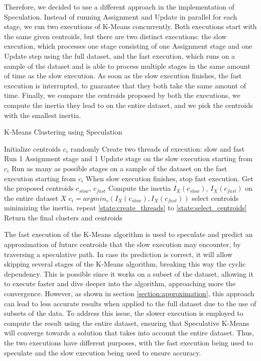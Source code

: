Therefore, we decided to use a different approach in the implementation of Speculation. Instead of running Assignment and Update in parallel for each stage, we run two executions of K-Means concurrently. Both executions start with the same given centroids, but there are two distinct executions: the slow execution, which processes one stage consisting of one Assignment stage and one Update step using the full dataset, and the fast execution, which runs on a sample of the dataset and is able to process multiple stages in the same amount of time as the slow execution. As soon as the slow execution finishes, the fast execution is interrupted, to guarantee that they both take the same amount of time.
Finally, we compare the centroids proposed by both the executions, we compute the inertia they lead to on the entire dataset, and we pick the centroids with the smallest inertia.
\begin{algorithm}
\caption{K-Means Clustering using Speculation}
\label{alg:kmeans_speculation}
\begin{algorithmic}[1]
\State Initialize centroids $c_i$ randomly
\State Create two threads of execution: slow and fast
\label{state:create_threads}
\State Run 1 Assignment stage and 1 Update stage on the slow execution starting from $c_i$
\State Run as many as possible stages on a sample of the dataset on the fast execution starting from $c_i$
\State When slow execution finishes, stop fast execution. Get the proposed centroids $c_{slow}$, $c_{fast}$
\State Compute the inertia $I_X(c_{slow})$, $I_X(c_{fast})$ on the entire dataset $X$
\State $c_i = argmin_c(I_X(c_{slow}), I_X(c_{fast}))$ select centroids minimizing the inertia.
\label{state:select_centroids}
    \State repeat \ref{state:create_threads} to \ref{state:select_centroids}
\EndWhile
\State Return the final clusters and centroids
\end{algorithmic}
\end{algorithm}

The fast execution of the K-Means algorithm is used to speculate and predict an approximation of future centroids that the slow execution may encounter, by traversing a speculative path. In case its prediction is correct, it will allow skipping several stages of the K-Means algorithm, breaking this way the cyclic dependency. This is possible since it works on a subset of the dataset, allowing it to execute faster and dive deeper into the algorithm, approaching more the convergence. However, as shown in section \ref{section:approximation}, this approach can lead to less accurate results when applied to the full dataset due to the use of subsets of the data.
To address this issue, the slower execution is employed to compute the result using the entire dataset, ensuring that Speculative K-Means will converge towards a solution that takes into account the entire dataset. Thus, the two executions have different purposes, with the fast execution being used to speculate and the slow execution being used to ensure accuracy.

